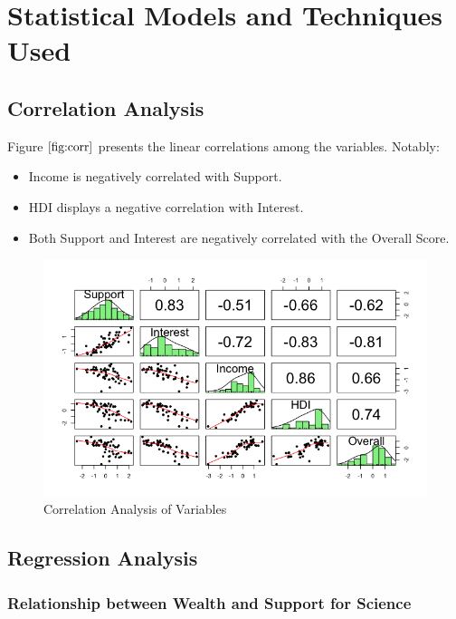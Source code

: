 \documentclass[12pt]{article}
\begin{document}
  \section{Statistical Models and Techniques Used}

  \subsection{Correlation Analysis}
  \label{ss.corr}
  
  Figure $\ref{fig:corr}$ presents the linear correlations among the variables. Notably:
  \begin{itemize}
  \item Income is negatively correlated with Support.
  \item HDI displays a negative correlation with Interest.
  \item Both Support and Interest are negatively correlated with the Overall Score.
  \end{itemize}
  
  \begin{figure}[htb]
  \centering
  \includegraphics[width=\linewidth]{images/corr}
  \caption{Correlation Analysis of Variables}
  \label{fig:corr}
  \end{figure}
  
  \subsection{Regression Analysis}
  \label{ss.reg}
  
  \subsubsection{Relationship between Wealth and Support for Science}
  \label{sss.incvssup}
  
\end{document}
